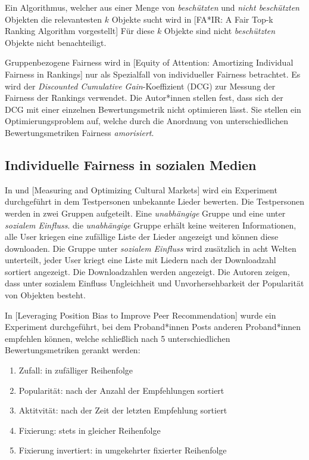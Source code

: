 Ein Algorithmus, welcher aus einer Menge von \textit{beschützten} und \textit{nicht beschützten} Objekten die relevantesten $k$ Objekte sucht wird in [FA*IR: A Fair Top-k Ranking Algorithm vorgestellt] Für diese $k$ Objekte sind nicht \textit{beschützten} Objekte nicht benachteiligt.

Gruppenbezogene Fairness wird in [Equity of Attention: Amortizing Individual Fairness in Rankings] nur als Spezialfall von individueller Fairness betrachtet. Es wird der \textit{Discounted Cumulative Gain}-Koeffizient (DCG) zur Messung der Fairness der Rankings verwendet. Die Autor*innen stellen fest, dass sich der DCG mit einer einzelnen Bewertungsmetrik nicht optimieren lässt. Sie stellen ein Optimierungsproblem auf, welche durch die Anordnung von unterschiedlichen Bewertungsmetriken Fairness \textit{amorisiert}.


\subsection{Individuelle Fairness in sozialen Medien}

In \cite{Salganik2006854} und [Measuring and Optimizing Cultural Markets] wird ein Experiment durchgeführt in dem Testpersonen unbekannte Lieder bewerten. Die Testpersonen werden in zwei Gruppen aufgeteilt. Eine \textit{unabhängige} Gruppe und eine unter \textit{sozialem Einfluss}. die \textit{unabhängige} Gruppe erhält keine weiteren Informationen, alle User kriegen eine zufällige Liste der Lieder angezeigt und können diese downloaden. Die Gruppe unter \textit{sozialem Einfluss} wird zusätzlich in acht Welten unterteilt, jeder User kriegt eine Liste mit Liedern nach der Downloadzahl sortiert angezeigt. Die Downloadzahlen werden angezeigt. Die Autoren zeigen, dass unter sozialem Einfluss Ungleichheit und Unvorhersehbarkeit der Popularität von Objekten besteht.

In [Leveraging Position Bias to Improve Peer Recommendation] wurde ein Experiment durchgeführt, bei dem Proband*innen Posts anderen Proband*innen empfehlen können, welche schließlich nach 5 unterschiedlichen Bewertungsmetriken gerankt werden: 
\begin{enumerate}
	\item Zufall: in zufälliger Reihenfolge
	\item Popularität: nach der Anzahl der Empfehlungen sortiert
	\item Aktitvität: nach der Zeit der letzten Empfehlung sortiert
	\item Fixierung: stets in gleicher Reihenfolge
	\item Fixierung invertiert: in umgekehrter fixierter Reihenfolge
\end{enumerate}

